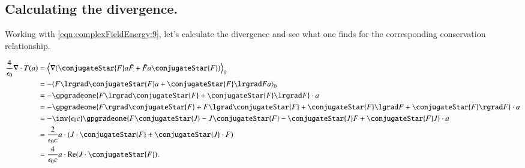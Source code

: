 %
%

\subsection{Calculating the divergence.}

Working with \ref{eqn:complexFieldEnergy:9}, let's calculate the divergence and see what one finds for the corresponding conservation relationship.

\begin{align*}
\frac{4}{\epsilon_0} \grad \cdot T(a) 
&=
\gpgradezero{ \grad ( \conjugateStar{F} a \tilde{F} + \tilde{F} a \conjugateStar{F} )} \\
&=
-\gpgradezero{ F \lrgrad \conjugateStar{F} a + \conjugateStar{F} \lrgrad F a } \\
&=
-\gpgradeone{ F \lrgrad \conjugateStar{F} + \conjugateStar{F} \lrgrad F } \cdot a \\
&=
-\gpgradeone{ 
F \rgrad \conjugateStar{F} 
+F \lgrad \conjugateStar{F} 
+ \conjugateStar{F} \lgrad F
+ \conjugateStar{F} \rgrad F
} \cdot a \\
&=
-\inv{\epsilon_0 c} \gpgradeone{ 
F \conjugateStar{J} 
- J \conjugateStar{F} 
- \conjugateStar{J} F
+ \conjugateStar{F} J
} \cdot a \\
&= \frac{2}{\epsilon_0 c} a \cdot ( 
J \cdot \conjugateStar{F} 
+ \conjugateStar{J} \cdot F
) \\
&= \frac{4}{\epsilon_0 c} a \cdot \Real ( J \cdot \conjugateStar{F} ).
\end{align*}

